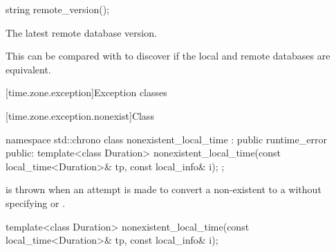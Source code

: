 %
\begin{itemdecl}
string remote_version();
\end{itemdecl}

\begin{itemdescr}
\pnum
\returns The latest remote database version.

\begin{note}
This can be compared with 
to discover if the local and remote databases are equivalent.
\end{note}
\end{itemdescr}

[time.zone.exception]{Exception classes}

[time.zone.exception.nonexist]{Class }

\begin{codeblock}
namespace std::chrono {
  class nonexistent_local_time : public runtime_error {
  public:
    template<class Duration>
      nonexistent_local_time(const local_time<Duration>& tp, const local_info& i);
  };
}
\end{codeblock}

\pnum
{} is thrown when
an attempt is made
to convert a non-existent  to a 
without specifying  or .

%
\begin{itemdecl}
template<class Duration>
  nonexistent_local_time(const local_time<Duration>& tp, const local_info& i);
\end{itemdecl}

